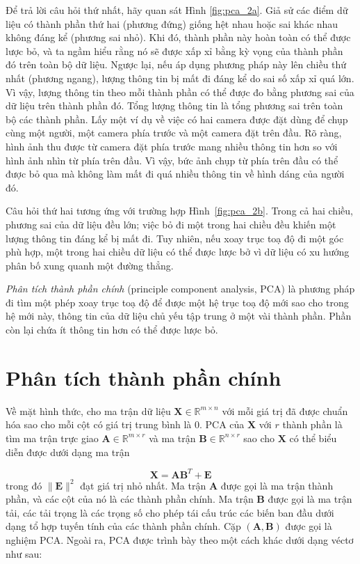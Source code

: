 \documentclass[12pt,a4paper,oneside]{report}
\numberwithin{equation}{section}
\begin{document}
Để trả lời câu hỏi thứ nhất, hãy quan sát Hình \ref{fig:pca_2a}. Giả sử các
điểm dữ liệu có thành phần thứ hai (phương đứng) giống hệt nhau hoặc sai khác
nhau không đáng kể (phương sai nhỏ). Khi đó, thành phần này hoàn toàn có thể được lược
bỏ, và ta ngầm hiểu rằng nó sẽ được xấp xỉ bằng kỳ vọng của thành phần đó
trên toàn bộ dữ liệu. Ngược lại, nếu áp dụng phương pháp này lên chiều thứ nhất (phương ngang), {lượng thông tin} bị mất đi đáng kể do sai số xấp xỉ quá lớn. Vì vậy, lượng thông tin theo mỗi thành phần có thể được đo bằng phương sai của dữ liệu trên thành phần đó. Tổng lượng
thông tin là tổng phương sai trên toàn bộ các thành phần. Lấy
một ví dụ về việc có hai camera được đặt dùng để chụp cùng một người, một camera
phía trước và một camera đặt trên đầu. Rõ ràng, hình ảnh thu được từ
camera đặt phía trước mang nhiều thông tin hơn so với hình ảnh nhìn từ
phía trên đầu. Vì vậy, bức ảnh chụp từ phía trên đầu có thể được bỏ qua mà không
làm mất đi quá nhiều thông tin về hình dáng của người đó.

Câu hỏi thứ hai tương ứng với trường hợp Hình~\ref{fig:pca_2b}. Trong cả hai
chiều, phương sai của dữ liệu đều lớn; việc bỏ đi một trong hai chiều đều khiến
một lượng thông tin đáng kể bị mất đi. Tuy nhiên, nếu xoay trục toạ độ đi một
góc phù hợp, một trong hai chiều dữ liệu có thể được lược bở vì dữ liệu có xu
hướng phân bố xung quanh một đường thẳng.

\textit{Phân tích thành phần chính} (principle component analysis, PCA) là
phương pháp đi tìm một phép xoay trục toạ độ để được một hệ trục toạ độ mới sao
cho trong hệ mới này, thông tin của dữ liệu chủ yếu tập trung ở một vài thành
phần. Phần còn lại chứa ít thông tin hơn có thể được lược bỏ.

\section{Phân tích thành phần chính}

Về mặt hình thức, cho ma trận dữ liệu $\mathbf{X} \in \mathbb{R}^{m \times n}$ với mỗi giá trị đã được chuẩn hóa sao cho mỗi cột có giá trị trung bình là 0. PCA của $\mathbf{X}$ với $r$ thành phần là tìm ma trận trực giao $\mathbf{A} \in \mathbb{R}^{m \times r}$ và ma trận $\mathbf{B} \in \mathbb{R}^{n \times r}$ sao cho $\mathbf{X}$ có thể biểu diễn được dưới dạng ma trận

$$
\mathbf{X}=\mathbf{A} \mathbf{B}^{T}+\mathbf{E}
$$
trong đó $\|\mathbf{E}\|^{2}$ đạt giá trị nhỏ nhất. Ma trận $\mathbf{A}$ được gọi là ma trận thành phần, và các cột của nó là các thành phần chính. Ma trận $\mathbf{B}$ được gọi là ma trận tải, các tải trọng là các trọng số cho phép tái cấu trúc các biến ban đầu dưới dạng tổ hợp tuyến tính của các thành phần chính. Cặp $(\mathbf{A}, \mathbf{B})$ được gọi là nghiệm PCA.
Ngoài ra, PCA được trình bày theo một cách khác dưới dạng véctơ như sau:
\end{document}
